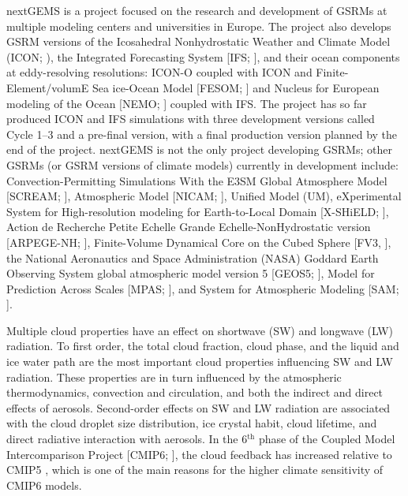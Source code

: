 \documentclass[draft]{agujournal2019}
\begin{document}
nextGEMS is a project \cite{nextgems} focused on the research and development of GSRMs at multiple modeling centers and universities in Europe. The project also develops GSRM versions of the Icosahedral Nonhydrostatic Weather and Climate Model (ICON; ), the Integrated Forecasting System [IFS; ], and their ocean components at eddy-resolving resolutions: ICON-O \cite{korn2022} coupled with ICON and Finite-Element/volumE Sea ice-Ocean Model [FESOM; ] and Nucleus for European modeling of the Ocean [NEMO; ] coupled with IFS. The project has so far produced ICON and IFS simulations with three development versions called Cycle 1--3 and a pre-final version, with a final production version planned by the end of the project. nextGEMS is not the only project developing GSRMs; other GSRMs (or GSRM versions of climate models) currently in development include: Convection-Permitting Simulations With the E3SM Global Atmosphere Model [SCREAM; ], Atmospheric Model [NICAM; ], Unified Model (UM), eXperimental System for High-resolution modeling for Earth-to-Local Domain [X-SHiELD; ], Action de Recherche Petite Echelle Grande Echelle-NonHydrostatic version [ARPEGE-NH; ], Finite-Volume Dynamical Core on the Cubed Sphere [FV3, ], the National Aeronautics and Space Administration (NASA) Goddard Earth Observing System global atmospheric model version 5 [GEOS5; ], Model for Prediction Across Scales [MPAS; ], and System for Atmospheric Modeling [SAM; ].

Multiple cloud properties have an effect on shortwave (SW) and longwave (LW) radiation. To first order, the total cloud fraction, cloud phase, and the liquid and ice water path are the most important cloud properties influencing SW and LW radiation. These properties are in turn influenced by the atmospheric thermodynamics, convection and circulation, and both the indirect and direct effects of aerosols. Second-order effects on SW and LW radiation are associated with the cloud droplet size distribution, ice crystal habit, cloud lifetime, and direct radiative interaction with aerosols. In the 6$^\mathrm{th}$ phase of the Coupled Model Intercomparison Project [CMIP6; ], the cloud feedback has increased relative to CMIP5 \cite{zelinka2020}, which is one of the main reasons for the higher climate sensitivity of CMIP6 models.
\end{document}
